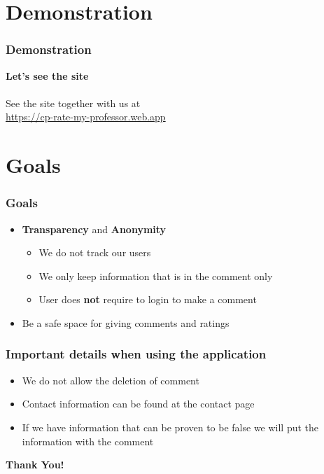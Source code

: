 \documentclass[aspectratio=169]{beamer}
\begin{document}
\section{Demonstration}
\begin{frame}
    \frametitle{Demonstration}
    \centering
        {\huge\textbf{Let's see the site}}\\~\\
        See the site together with us at \\
        {\color{blue}\url{https://cp-rate-my-professor.web.app}}
\end{frame}
\section{Goals}
\begin{frame}
    \frametitle{Goals}
    \begin{spacing}{1.5}
        \begin{itemize}
            \item {\color{blue}\textbf{Transparency}} and {\color{blue}\textbf{Anonymity}}
                  \begin{itemize}
                      \item We do not track our users
                      \item We only keep information that is in the comment only
                      \item User does \textbf{not} require to login to make a comment
                  \end{itemize}
            \item Be a safe space for giving comments and ratings
        \end{itemize}
    \end{spacing}
\end{frame}
\begin{frame}
    \frametitle{Important details when using the application}
    \begin{itemize}
        \item We do not allow the deletion of comment
        \item Contact information can be found at the contact page
        \item If we have information that can be proven to be false we will put the information with the comment
    \end{itemize}
\end{frame}
\begin{frame}
    \centering
    \huge{\textbf{Thank You!}}
\end{frame}
\end{document}
